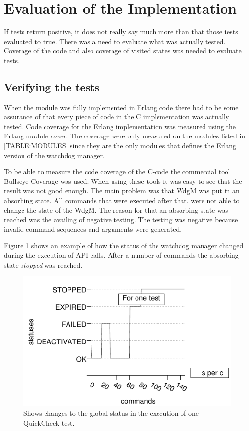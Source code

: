\section{Evaluation of the Implementation}
If tests return positive, it does not really say much more than
that those tests evaluated to true. There was a need to evaluate what
was actually tested. Coverage of the code and also coverage of visited
states was needed to evaluate tests.

\subsection{Verifying the tests}
When the module was fully implemented in Erlang code there had to be
some assurance of that every piece of code in the C implementation was
actually tested.  Code coverage for the Erlang implementation was
measured using the Erlang module \emph{cover}. The coverage were only
measured on the modules listed in \ref{TABLE:MODULES} since they are
the only modules that defines the Erlang version of the watchdog
manager.

To be able to measure the code coverage of the C-code the commercial
tool Bullseye Coverage was used. When using these tools it was easy to
see that the result was not good enough.
The main problem was that WdgM was put in an absorbing state. All commands
that were executed after that, were not able to change the state of the WdgM.
The reason for that an absorbing state was reached was the
availing of negative testing. The testing was negative because invalid command
sequences and arguments were generated.

Figure \ref{FIG:ONERUN} shows an example of how the status of the
watchdog manager changed during the execution of API-calls. After a
number of commands the absorbing state \emph{stopped} was reached.

\begin{figure}
  \begin{center}
    \includegraphics{generated_pictures/one_test_history_statuses_freescale.pdf}
    \caption{Shows changes to the global status in the execution of one QuickCheck test.}
    \label{FIG:ONERUN}
  \end{center}
\end{figure}

